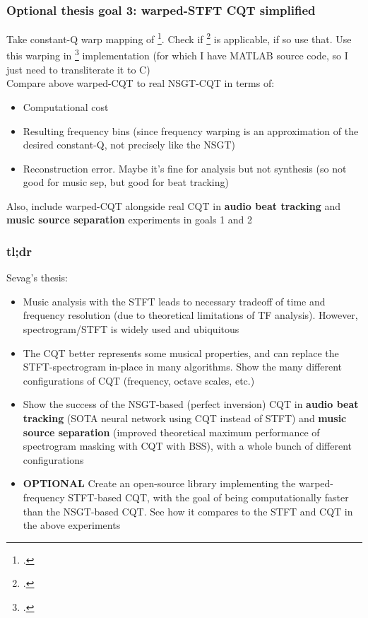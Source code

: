 \documentclass[usenames,dvipsnames]{beamer}
\begin{document}
\begin{frame}
	\frametitle{Optional thesis goal 3: warped-STFT CQT simplified}
	Take constant-Q warp mapping of \footcite{cqwarp}. Check if \footcite{betterwarp} is applicable, if so use that. Use this warping in \footcite{makur2008} implementation (for which I have MATLAB source code, so I just need to transliterate it to C)\\
	Compare above warped-CQT to real NSGT-CQT in terms of:
	\begin{itemize}
		\item
			Computational cost
		\item
			Resulting frequency bins (since frequency warping is an approximation of the desired constant-Q, not precisely like the NSGT)
		\item
			Reconstruction error. Maybe it's fine for analysis but not synthesis (so not good for music sep, but good for beat tracking)
	\end{itemize}

	Also, include warped-CQT alongside real CQT in \textbf{audio beat tracking} and \textbf{music source separation} experiments in goals 1 and 2
\end{frame}

\begin{frame}
	\frametitle{tl;dr}
	Sevag's thesis:
	\begin{itemize}
		\item
			Music analysis with the STFT leads to necessary tradeoff of time and frequency resolution (due to theoretical limitations of TF analysis). However, spectrogram/STFT is widely used and ubiquitous
		\item
			The CQT better represents some musical properties, and can replace the STFT-spectrogram in-place in many algorithms. Show the many different configurations of CQT (frequency, octave scales, etc.)
		\item
			Show the success of the NSGT-based (perfect inversion) CQT in \textbf{audio beat tracking} (SOTA neural network using CQT instead of STFT) and \textbf{music source separation} (improved theoretical maximum performance of spectrogram masking with CQT with BSS), with a whole bunch of different configurations
		\item
			\textbf{OPTIONAL} Create an open-source library implementing the warped-frequency STFT-based CQT, with the goal of being computationally faster than the NSGT-based CQT. See how it compares to the STFT and CQT in the above experiments
	\end{itemize}
\end{frame}
\end{document}
